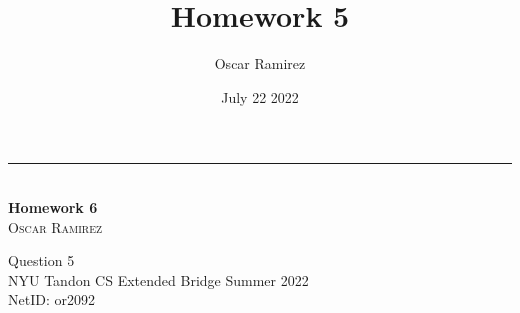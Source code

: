 \documentclass[12pt, letterpaper, twoside]{article}
\title{\textbf{Homework 5}}
\author{Oscar Ramirez}
\date{July 22 2022}
\begin{document}
\begin{titlepage}   

    \raggedleft %

    \rule{1pt}{\textheight} %
    \hspace{0.05\textwidth} %
    \parbox[b]{0.75\textwidth}{ %
        {\large\textit{}}\\[4\baselineskip]

        {\Huge\bfseries Homework 6}\\[2\baselineskip] %

        {\Large\textsc{Oscar Ramirez}} %

        \vspace{0.47\textheight} %
        {\noindent Question 5}\\[0.1\baselineskip]
        {\noindent NYU Tandon CS Extended Bridge Summer 2022}\\[0.1\baselineskip]
        {\noindent NetID: or2092}\\[\baselineskip]
    }

\end{titlepage}
\newpage
\end{document}
